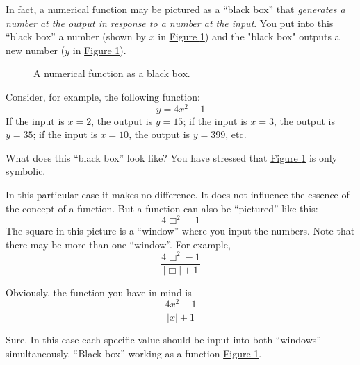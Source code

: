 {In fact, a numerical function may be pictured as a ``black box'' that \emph{generates a number at the output in response to a number at the input}. You put into this ``black box'' a number (shown by $x$ in \hyperref[fig-10]{Figure \ref{fig-10}}) and the "black box" outputs a new number ($y$ in \hyperref[fig-10]{Figure \ref{fig-10}}).
\begin{figure}[!h]
\centering

\caption{A numerical function as a black box.}
\label{fig-10}
\end{figure}
Consider, for example, the following function: 
\begin{equation*}%
y = 4x^{2} - 1
\end{equation*}
If the input is $x= 2$, the output is $y=15$; if the input is $x=3$, the output is $y= 35$; if the input is $x=10$, the output is $y = 399$, etc.

\rdr What does this ``black box'' look like? You have stressed that \hyperref[fig-10]{Figure \ref{fig-10}} is only symbolic.

\athr In this particular case it makes no difference. It does not influence the essence of the concept of a function. But a function can also be ``pictured'' like this:
\begin{equation*}%
4 \Box^{2} - 1
\end{equation*}
The square in this picture is a ``window'' where you input the numbers. Note that there may be more than one ``window''. For example,
\begin{equation*}%
\frac{4 \Box^{2} - 1}{|\Box| + 1}
\end{equation*}

\rdr Obviously, the function you have in mind is 
\begin{equation*}%
\frac{4 x^{2} - 1}{|x| + 1}
\end{equation*}

\athr Sure. In this case each specific value should be input into both ``windows'' simultaneously. ``Black box'' working as a function
 \hyperref[fig-10]{Figure \ref{fig-10}}.

}
